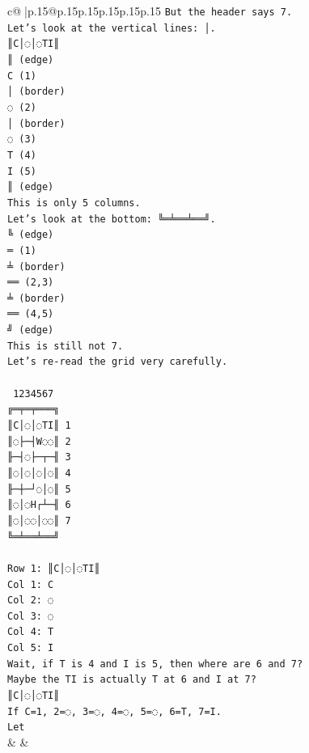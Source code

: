 \documentclass{article}
\begin{document}
{\begin{supertabular}{c@{$\;$}|p{.15\linewidth}@{}p{.15\linewidth}p{.15\linewidth}p{.15\linewidth}p{.15\linewidth}p{.15\linewidth}}
{{{\texttt{But the header says 7.} \\
\texttt{Let's look at the vertical lines: │.} \\
\texttt{║C│◌│◌TI║} \\
\texttt{║ (edge)} \\
\texttt{C (1)} \\
\texttt{│ (border)} \\
\texttt{◌ (2)} \\
\texttt{│ (border)} \\
\texttt{◌ (3)} \\
\texttt{T (4)} \\
\texttt{I (5)} \\
\texttt{║ (edge)} \\
\texttt{This is only 5 columns.} \\
\texttt{Let's look at the bottom: ╚═╧══╧══╝.} \\
\texttt{╚ (edge)} \\
\texttt{═ (1)} \\
\texttt{╧ (border)} \\
\texttt{══ (2,3)} \\
\texttt{╧ (border)} \\
\texttt{══ (4,5)} \\
\texttt{╝ (edge)} \\
\texttt{This is still not 7.} \\
\texttt{Let's re{-}read the grid very carefully.} \\
\\ 
\texttt{ 1234567} \\
\texttt{╔═╤═╤═══╗} \\
\texttt{║C│◌│◌TI║ 1} \\
\texttt{║◌├─┤W◌◌║ 2} \\
\texttt{╟─┤◌├─┬─╢ 3} \\
\texttt{║◌│◌│◌│◌║ 4} \\
\texttt{╟─┼─┘◌│◌║ 5} \\
\texttt{║◌│◌H┌┴─╢ 6} \\
\texttt{║◌│◌◌│◌◌║ 7} \\
\texttt{╚═╧══╧══╝} \\
\\ 
\texttt{Row 1: ║C│◌│◌TI║} \\
\texttt{Col 1: C} \\
\texttt{Col 2: ◌} \\
\texttt{Col 3: ◌} \\
\texttt{Col 4: T} \\
\texttt{Col 5: I} \\
\texttt{Wait, if T is 4 and I is 5, then where are 6 and 7?} \\
\texttt{Maybe the TI is actually T at 6 and I at 7?} \\
\texttt{║C│◌│◌TI║} \\
\texttt{If C=1, 2=◌, 3=◌, 4=◌, 5=◌, 6=T, 7=I.} \\
\texttt{Let} \\
            }
        }
    }
    & & \\ \\


\end{supertabular}}
\end{document}
